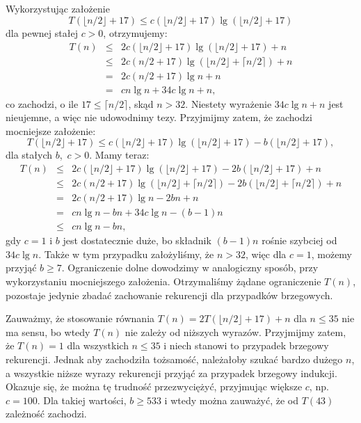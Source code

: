 \subsection{} %
Wykorzystując założenie
\[
	T(\lfloor n/2\rfloor+17) \le c(\lfloor n/2\rfloor+17)\lg(\lfloor n/2\rfloor+17)
\]
dla pewnej stałej $c>0$, otrzymujemy:
\begin{eqnarray*}
	T(n) &\le& 2c(\lfloor n/2\rfloor+17)\lg(\lfloor n/2\rfloor+17)+n \\
	&\le& 2c(n/2+17)\lg(\lfloor n/2\rfloor+\lceil n/2\rceil)+n \\
	&=& 2c(n/2+17)\lg n+n \\
	&=& cn\lg n+34c\lg n+n,
\end{eqnarray*}
co zachodzi, o ile $17\le\lceil n/2\rceil$, skąd $n>32$. Niestety wyrażenie $34c\lg n+n$ jest nieujemne, a więc nie udowodnimy tezy. Przyjmijmy zatem, że zachodzi mocniejsze założenie:
\[
	T(\lfloor n/2\rfloor+17) \le c(\lfloor n/2\rfloor+17)\lg(\lfloor n/2\rfloor+17)-b(\lfloor n/2\rfloor+17),
\]
dla stałych $b$,~$c>0$. Mamy teraz:
\begin{eqnarray*}
	T(n) &\le& 2c(\lfloor n/2\rfloor+17)\lg(\lfloor n/2\rfloor+17)-2b(\lfloor n/2\rfloor+17)+n \\
	&\le& 2c(n/2+17)\lg(\lfloor n/2\rfloor+\lceil n/2\rceil)-2b(\lfloor n/2\rfloor+\lceil n/2\rceil)+n \\
	&=& 2c(n/2+17)\lg n-2bn+n \\
	&=& cn\lg n-bn+34c\lg n-(b-1)n \\
	&\le& cn\lg n-bn,
\end{eqnarray*}
gdy $c=1$ i $b$ jest dostatecznie duże, bo składnik $(b-1)n$ rośnie szybciej od $34c\lg n$. Także w tym przypadku założyliśmy, że $n>32$, więc dla $c=1$, możemy przyjąć $b\ge7$. Ograniczenie dolne dowodzimy w analogiczny sposób, przy wykorzystaniu mocniejszego założenia. Otrzymaliśmy żądane ograniczenie $T(n)$, pozostaje jedynie zbadać zachowanie rekurencji dla przypadków brzegowych.

Zauważmy, że stosowanie równania $T(n)=2T(\lfloor n/2\rfloor+17)+n$ dla $n\le35$ nie ma sensu, bo wtedy $T(n)$ nie zależy od niższych wyrazów. Przyjmijmy zatem, że $T(n)=1$ dla wszystkich $n\le35$ i niech stanowi to przypadek brzegowy rekurencji. Jednak aby zachodziła tożsamość, należałoby szukać bardzo dużego $n$, a wszystkie niższe wyrazy rekurencji przyjąć za przypadek brzegowy indukcji. Okazuje się, że można tę trudność przezwyciężyć, przyjmując większe $c$, np. $c=100$. Dla takiej wartości, $b\ge533$ i wtedy można zauważyć, że od $T(43)$ zależność zachodzi.


